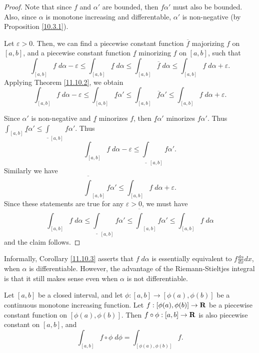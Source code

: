\begin{proof}
    Note that since \(f\) and \(\alpha'\) are bounded, then \(f \alpha'\) must also be bounded.
    Also, since \(\alpha\) is monotone increasing and differentable, \(\alpha'\) is non-negative (by Proposition \ref{10.3.1}).

    Let \(\varepsilon > 0\).
    Then, we can find a piecewise constant function \(\overline{f}\) majorizing \(f\) on \([a, b]\), and a piecewise constant function \(\underline{f}\) minorizing \(f\) on \([a, b]\), such that
    \[
        \int_{[a, b]} f \; d \alpha - \varepsilon \leq \int_{[a, b]} \underline{f} \; d \alpha \leq \int_{[a, b]} \overline{f} \; d \alpha \leq \int_{[a, b]} f \; d \alpha + \varepsilon.
    \]
    Applying Theorem \ref{11.10.2}, we obtain
    \[
        \int_{[a, b]} f \; d \alpha - \varepsilon \leq \int_{[a, b]} \underline{f} \alpha' \leq \int_{[a, b]} \overline{f} \alpha' \leq \int_{[a, b]} f \; d \alpha + \varepsilon.
    \]

    Since \(\alpha'\) is non-negative and \(\underline{f}\) minorizes \(f\), then \(\underline{f} \alpha'\) minorizes \(f \alpha'\).
    Thus \(\int_{[a, b]} \underline{f} \alpha' \leq \underline{\int}_{[a, b]} f \alpha'\).
    Thus
    \[
        \int_{[a, b]} f \; d \alpha - \varepsilon \leq \underline{\int}_{[a, b]} f \alpha'.
    \]
    Similarly we have
    \[
        \overline{\int}_{[a, b]} f \alpha' \leq \int_{[a, b]} f \; d \alpha + \varepsilon.
    \]
    Since these statements are true for any \(\varepsilon > 0\), we must have
    \[
        \int_{[a, b]} f \; d \alpha \leq \underline{\int}_{[a, b]} f \alpha' \leq \overline{\int}_{[a, b]} f \alpha' \leq \int_{[a, b]} f \; d \alpha
    \]
    and the claim follows.
\end{proof}

\begin{remark}\label{11.10.4}
    Informally, Corollary \ref{11.10.3} asserts that \(f \; d \alpha\) is essentially equivalent to \(f \frac{d \alpha}{dx} dx\), when \(\alpha\) is differentiable.
    However, the advantage of the Riemann-Stieltjes integral is that it still makes sense even when \(\alpha\) is not differentiable.
\end{remark}

\begin{lemma}\label{11.10.5}
    Let \([a, b]\) be a closed interval, and let \(\phi : [a, b] \to [\phi(a), \phi(b)]\) be a continuous monotone increasing function.
    Let \(f : [\phi(a), \phi(b)] \to \mathbf{R}\) be a piecewise constant function on \([\phi(a), \phi(b)]\).
    Then \(f \circ \phi : [a, b] \to \mathbf{R}\) is also piecewise constant on \([a, b]\), and
    \[
        \int_{[a, b]} f \circ \phi \; d \phi = \int_{[\phi(a), \phi(b)]} f.
    \]
\end{lemma}

